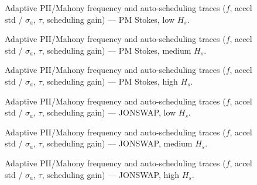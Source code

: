 \documentclass[11pt,letterpaper]{article}
\begin{document}
    \begin{figure}[H]\centering
    \resizebox{\textwidth}{!}{}
    \caption{Adaptive PII/Mahony frequency and auto-scheduling traces ($f$, accel std / $\sigma_a$, $\tau$, scheduling gain) --- PM Stokes, low $H_s$.}
    \label{fig:w3d_nonkalman_pmstokes_low_tuner}
    \end{figure}

    \begin{figure}[H]\centering
    \resizebox{\textwidth}{!}{}
    \caption{Adaptive PII/Mahony frequency and auto-scheduling traces ($f$, accel std / $\sigma_a$, $\tau$, scheduling gain) --- PM Stokes, medium $H_s$.}
    \label{fig:w3d_nonkalman_pmstokes_medium_tuner}
    \end{figure}

    \begin{figure}[H]\centering
    \resizebox{\textwidth}{!}{}
    \caption{Adaptive PII/Mahony frequency and auto-scheduling traces ($f$, accel std / $\sigma_a$, $\tau$, scheduling gain) --- PM Stokes, high $H_s$.}
    \label{fig:w3d_nonkalman_pmstokes_high_tuner}
    \end{figure}

    \begin{figure}[H]\centering
    \resizebox{\textwidth}{!}{}
    \caption{Adaptive PII/Mahony frequency and auto-scheduling traces ($f$, accel std / $\sigma_a$, $\tau$, scheduling gain) --- JONSWAP, low $H_s$.}
    \label{fig:w3d_nonkalman_jonswap_low_tuner}
    \end{figure}

    \begin{figure}[H]\centering
    \resizebox{\textwidth}{!}{}
    \caption{Adaptive PII/Mahony frequency and auto-scheduling traces ($f$, accel std / $\sigma_a$, $\tau$, scheduling gain) --- JONSWAP, medium $H_s$.}
    \label{fig:w3d_nonkalman_jonswap_medium_tuner}
    \end{figure}

    \begin{figure}[H]\centering
    \resizebox{\textwidth}{!}{}
    \caption{Adaptive PII/Mahony frequency and auto-scheduling traces ($f$, accel std / $\sigma_a$, $\tau$, scheduling gain) --- JONSWAP, high $H_s$.}
    \label{fig:w3d_nonkalman_jonswap_high_tuner}
    \end{figure}
\end{document}

